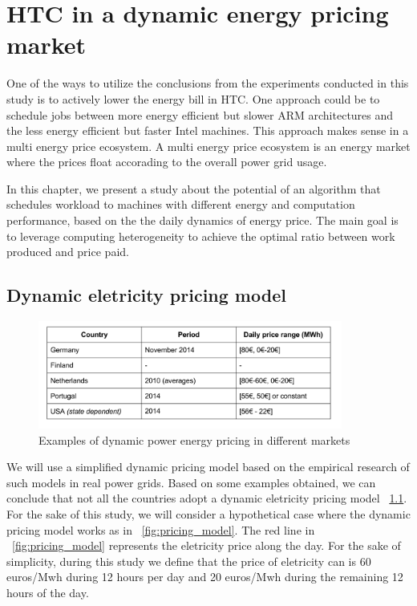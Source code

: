 \chapter{HTC in a dynamic energy pricing market}

One of the ways to utilize the conclusions from the experiments conducted in this study is to actively lower the energy bill in HTC. One approach could be to schedule jobs between more energy efficient but slower ARM architectures and the less energy efficient but faster Intel machines. This approach makes sense in a multi energy price ecosystem. A multi energy price ecosystem is an energy market where the prices float accorading to the overall power grid usage.

In this chapter, we present a study about the potential of an algorithm that schedules workload to machines with different energy and computation performance, based on the the daily dynamics of energy price. The main goal is to leverage computing heterogeneity to achieve the optimal ratio between work produced and price paid.  

\section{Dynamic eletricity pricing model}

\begin{figure}[hours]
  \centering
    \includegraphics[width=100mm]{"img/pricing_model_table"}
    \caption{Examples of dynamic power energy pricing in different markets}
    \label{fig:pricing_model_table}
\end{figure}

We will use a simplified dynamic pricing model based on the empirical research of such models in real power grids. Based on some examples obtained, we can conclude that not all the countries adopt a dynamic eletricity pricing model ~\ref{fig:pricing_model_table}. For the sake of this study, we will consider a hypothetical case where the dynamic pricing model works as in ~\ref{fig:pricing_model}. The red line in ~\ref{fig:pricing_model} represents the eletricity price along the day. For the sake of simplicity, during this study we define that the price of eletricity can is  60 euros/Mwh during 12 hours per day and 20 euros/Mwh during the remaining 12 hours of the day.  
	

